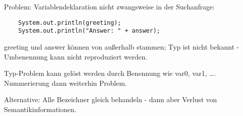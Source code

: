 Problem: Variablendeklaration nicht zwangsweise in der Suchanfrage:

\begin{verbatim}
    System.out.println(greeting);
    System.out.println("Answer: " + answer);
\end{verbatim}

greeting und answer können von außerhalb stammen;
Typ ist nicht bekannt -
Umbenennung kann nicht reproduziert werden.

Typ-Problem kann gelöst werden durch Benennung wie var0, var1, \ldots.
Nummerierung dann weiterhin Problem.

Alternative: Alle Bezeichner gleich behandeln - dann aber Verlust von Semantikinformationen.
